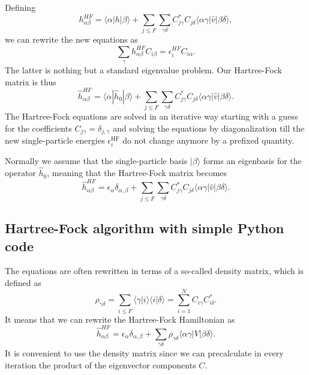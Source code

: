 Defining
\[
h_{\alpha\beta}^{HF}=\langle \alpha | h | \beta \rangle+
\sum_{j\le F}\sum_{\gamma\delta} C^*_{j\gamma}C_{j\delta}\langle
\alpha\gamma|\hat{v}|\beta\delta\rangle,
\]
we can rewrite the new equations as
\begin{equation}
\sum_{\gamma}h_{\alpha\beta}^{HF}C_{i\beta}=\epsilon_i^{HF}C_{i\alpha}. \label{eq:newhf}
\end{equation}
The latter is nothing but a standard eigenvalue problem.  Our
Hartree-Fock matrix is thus
\[
\hat{h}_{\alpha\beta}^{HF}=\langle \alpha | \hat{h}_0 | \beta \rangle+
\sum_{j\le F}\sum_{\gamma\delta} C^*_{j\gamma}C_{j\delta}\langle
\alpha\gamma|\hat{v}|\beta\delta\rangle.
\]
The Hartree-Fock equations are solved in an iterative way starting
with a guess for the coefficients $C_{j\gamma}=\delta_{j,\gamma}$ and
solving the equations by diagonalization till the new single-particle
energies $\epsilon_i^{\mathrm{HF}}$ do not change anymore by a
prefixed quantity.

Normally we assume that the single-particle basis $|\beta\rangle$
forms an eigenbasis for the operator $\hat{h}_0$, meaning that the
Hartree-Fock matrix becomes
\[
\hat{h}_{\alpha\beta}^{HF}=\epsilon_{\alpha}\delta_{\alpha,\beta}+
\sum_{j\le F}\sum_{\gamma\delta} C^*_{j\gamma}C_{j\delta}\langle
\alpha\gamma|\hat{v}|\beta\delta\rangle.
\]

\subsection{Hartree-Fock algorithm with simple Python code}

The equations are often rewritten in terms of a so-called density matrix,
which is defined as 
\begin{equation}
\rho_{\gamma\delta}=\sum_{i\le F}\langle\gamma|i\rangle\langle i|\delta\rangle = \sum_{i=1}^{N}C_{i\gamma}C^*_{i\delta}.
\end{equation}
It means that we can rewrite the Hartree-Fock Hamiltonian as
\[
\hat{h}_{\alpha\beta}^{HF}=\epsilon_{\alpha}\delta_{\alpha,\beta}+
\sum_{\gamma\delta} \rho_{\gamma\delta}\langle \alpha\gamma|V|\beta\delta\rangle.
\]
It is convenient to use the density matrix since we can precalculate in every iteration the product of the eigenvector components $C$. 

